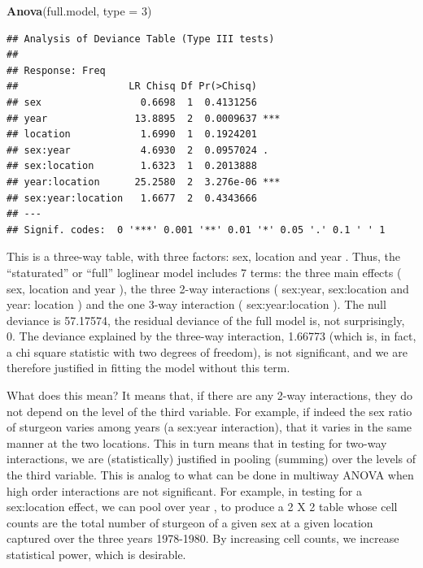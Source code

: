 \documentclass[
  12pt,
]{book}
\newenvironment{Shaded}{\begin{snugshade}}{\end{snugshade}}
\newcommand{\DataTypeTok}[1]{\textcolor[rgb]{0.13,0.29,0.53}{#1}}
\newcommand{\DecValTok}[1]{\textcolor[rgb]{0.00,0.00,0.81}{#1}}
\newcommand{\KeywordTok}[1]{\textcolor[rgb]{0.13,0.29,0.53}{\textbf{#1}}}
\newcommand{\NormalTok}[1]{#1}
\begin{document}
\begin{Shaded}
\begin{Highlighting}[]
\KeywordTok{Anova}\NormalTok{(full.model, }\DataTypeTok{type =} \DecValTok{3}\NormalTok{)}
\end{Highlighting}
\end{Shaded}

\begin{verbatim}
## Analysis of Deviance Table (Type III tests)
## 
## Response: Freq
##                   LR Chisq Df Pr(>Chisq)    
## sex                 0.6698  1  0.4131256    
## year               13.8895  2  0.0009637 ***
## location            1.6990  1  0.1924201    
## sex:year            4.6930  2  0.0957024 .  
## sex:location        1.6323  1  0.2013888    
## year:location      25.2580  2  3.276e-06 ***
## sex:year:location   1.6677  2  0.4343666    
## ---
## Signif. codes:  0 '***' 0.001 '**' 0.01 '*' 0.05 '.' 0.1 ' ' 1
\end{verbatim}

This is a three-way table, with three factors: sex, location and year . Thus, the ``staturated'' or ``full'' loglinear model includes 7 terms: the three main effects ( sex, location and year ), the three 2-way interactions ( sex:year, sex:location and year: location ) and the one 3-way interaction ( sex:year:location ). The null deviance is 57.17574, the residual deviance of the full model is, not surprisingly, 0. The deviance explained by the three-way interaction, 1.66773 (which is, in fact, a chi square statistic with two degrees of freedom), is not significant, and we are therefore justified in fitting the model without this term.

What does this mean? It means that, if there are any 2-way interactions, they do not depend on the level of the third variable. For example, if indeed the sex ratio of sturgeon varies among years (a sex:year interaction), that it varies in the same manner at the two locations. This in turn means that in testing for two-way interactions, we are (statistically) justified in pooling (summing) over the levels of the third variable. This is analog to what can be done in multiway ANOVA when high order interactions are not significant. For example, in testing for a sex:location effect, we can pool over year , to produce a 2 X 2 table whose cell counts are the total number of sturgeon of a given sex at a given location captured over the three years 1978-1980. By increasing cell counts, we increase statistical power, which is desirable.
\end{document}
